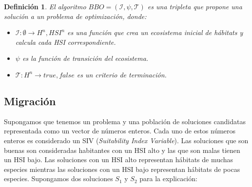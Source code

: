 \documentclass{article}
\newtheorem{mydef}{Definición}
\begin{document}
\begin{mydef}
    El algoritmo $BBO = (\mathcal{I},\psi,\mathcal{T})$ es una tripleta que propone una solución a un problema de optimización, donde:
    \begin{itemize}
        \item $\mathcal{I}: \emptyset \rightarrow {H^{n},HSI^{n}}$ es una función que crea un ecosistema inicial de hábitats y calcula cada HSI correspondiente.
        \item $\psi$ es la función de transición del ecosistema.
        \item$ \mathcal{T}: H^{n} \rightarrow {true,false}$ es un criterio de terminación.
    \end{itemize}
\end{mydef}


\subsection{Migración} \label{sec:migration}

Supongamos que tenemos un problema y una población de soluciones candidatas representada como un vector de números enteros. Cada uno de estos números enteros es considerado un SIV (\textit{Suitability Index Variable}).
Las soluciones que son buenas son consideradas habitantes con un HSI alto y las que son malas tienen un HSI bajo. Las soluciones con un HSI alto representan hábitats de muchas especies mientras las soluciones con un HSI bajo representan hábitats de pocas especies. Supongamos dos soluciones $S_1$ y $S_2$ para la explicación:
\end{document}
